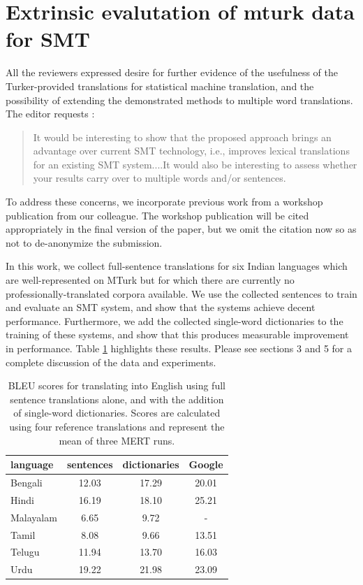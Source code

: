 \documentclass[11pt]{article}
\begin{document}
\section{Extrinsic evalutation of mturk data for SMT}

All the reviewers expressed desire for further evidence of the usefulness of the Turker-provided translations for statistical machine translation, and the possibility of extending the demonstrated methods to multiple word translations. The editor requests :

\begin{quote}
It would be interesting to show that the proposed approach brings an advantage over current SMT technology, i.e., improves lexical translations for an existing SMT system....It would also be interesting to assess whether your results carry over to multiple words and/or sentences. 
\end{quote}

To address these concerns, we incorporate previous work from a workshop publication from our colleague. The workshop publication will be cited appropriately in the final version of the paper, but we omit the citation now so as not to de-anonymize the submission. 

In this work, we collect full-sentence translations for six Indian languages which are well-represented on MTurk but for which there are currently no professionally-translated corpora available. We use the collected sentences to train and evaluate an SMT system, and show that the systems achieve decent performance. Furthermore, we add the collected single-word dictionaries to the training of these systems, and show that this produces measurable improvement in performance. Table \ref{dictionary_bleu} highlights these results. Please see sections 3 and 5 for a complete discussion of the data and experiments. 

\begin{table}[t]
\centering
\begin{tabular}{l|ccc}
  language  & sentences &  dictionaries & Google \\
  \hline\hline
  Bengali    &  12.03 & 17.29 & 20.01 \\
  Hindi      & 16.19 & 18.10 & 25.21\\  
  Malayalam    &  6.65 & 9.72 & - \\      
  Tamil      & 8.08 & 9.66 & 13.51\\  
  Telugu     & 11.94 & 13.70 & 16.03\\  
  Urdu        & 19.22 & 21.98 & 23.09\\   
\end{tabular}
\caption{BLEU scores for translating into English using full sentence translations alone, and with the addition of single-word dictionaries. Scores are calculated using four reference translations and represent the mean of three MERT runs.}
\label{dictionary_bleu}
\end{table}
\end{document}
